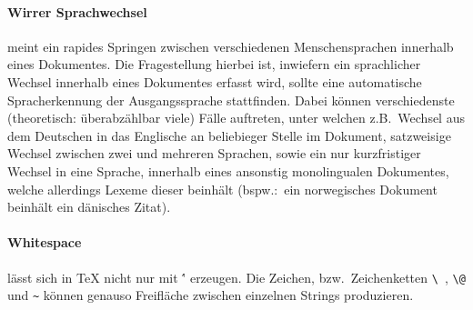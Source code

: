 \paragraph*{Wirrer Sprachwechsel} meint ein rapides Springen zwischen verschiedenen Menschensprachen innerhalb eines Dokumentes. Die Fragestellung hierbei ist, inwiefern ein sprachlicher Wechsel innerhalb eines Dokumentes erfasst wird, sollte eine automatische Spracherkennung der Ausgangssprache stattfinden. Dabei können verschiedenste (theoretisch: überabzählbar viele) Fälle auftreten, unter welchen z.B.\ Wechsel aus dem Deutschen in das Englische an beliebieger Stelle im Dokument, satzweisige Wechsel zwischen zwei und mehreren Sprachen, sowie ein nur kurzfristiger Wechsel in eine Sprache, innerhalb eines ansonstig monolingualen Dokumentes, welche allerdings Lexeme dieser beinhält (bspw.:\ ein norwegisches Dokument beinhält ein dänisches Zitat).

\paragraph*{Whitespace} lässt sich in \TeX{} nicht nur mit \' ' erzeugen. Die Zeichen, bzw.\ Zeichenketten \verb|\ |, \verb|\@| und \verb|~| können genauso Freifläche zwischen einzelnen Strings produzieren.